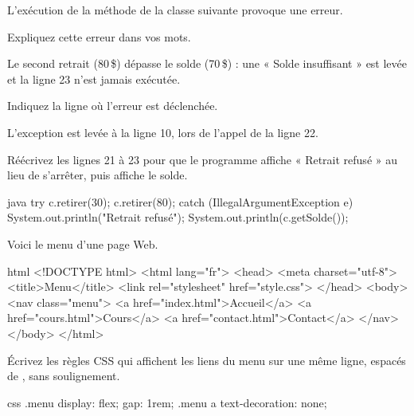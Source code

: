 \begin{question}[points=5]
  L'exécution de la méthode  de la classe suivante
  provoque une erreur.
  \begin{subquestion}[lines=3]
    Expliquez cette erreur dans vos mots.
    \begin{solution}
      Le second retrait (80\,\$) dépasse le solde (70\,\$) :
      une  « Solde insuffisant »
      est levée et la ligne 23 n'est jamais exécutée.
    \end{solution}
  \end{subquestion}
  \begin{subquestion}[lines=2]
    Indiquez la ligne où l'erreur est déclenchée.
    \begin{solution}
      L'exception est levée à la ligne 10, lors de l'appel de la ligne 22.
    \end{solution}
  \end{subquestion}
  \begin{subquestion}[box=5cm]
    Réécrivez les lignes 21 à 23 pour que le programme affiche
    « Retrait refusé » au lieu de s'arrêter, puis affiche le solde.
    \begin{solution}
\begin{code}[numbers=none]{java}
try {
    c.retirer(30);
    c.retirer(80);
} catch (IllegalArgumentException e) {
    System.out.println("Retrait refusé");
}
System.out.println(c.getSolde());
\end{code}
    \end{solution}
  \end{subquestion}
\end{question}

\begin{question}[points=2, box=6cm]
  Voici le menu d'une page Web.
\begin{code}{html}
<!DOCTYPE html>
<html lang="fr">
<head>
  <meta charset="utf-8">
  <title>Menu</title>
  <link rel="stylesheet" href="style.css">
</head>
<body>
  <nav class="menu">
    <a href="index.html">Accueil</a>
    <a href="cours.html">Cours</a>
    <a href="contact.html">Contact</a>
  </nav>
</body>
</html>
\end{code}
  Écrivez les règles CSS qui affichent les liens du menu sur une même
  ligne, espacés de , sans soulignement.
  \begin{solution}
\begin{code}[numbers=none]{css}
.menu {
  display: flex;
  gap: 1rem;
}
.menu a {
  text-decoration: none;
}
\end{code}
  \end{solution}
\end{question}

